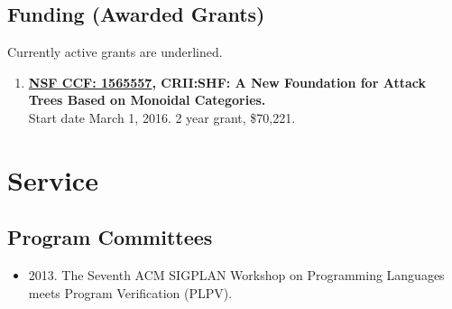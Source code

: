 \documentclass{article}
\begin{document}
    \subsection{Funding (Awarded Grants)}
    \label{subsec:funding_(awarded_grants)}
    Currently active grants are underlined.

    \begin{enumerate}
    \item \textbf{\underline{NSF CCF: 1565557}, CRII:SHF: A New Foundation for Attack Trees Based on Monoidal Categories.}\\
      Start date March 1, 2016. 2 year grant, \$70,221.
    \end{enumerate}
    


    
  \section{Service}
  \label{sec:service}
  \subsection{Program Committees}
  \label{subsec:program_committees}
  \begin{itemize}
  \item[] 2013. The Seventh ACM SIGPLAN Workshop on Programming Languages meets Program Verification (PLPV).
  \end{itemize}
  
\end{document}
